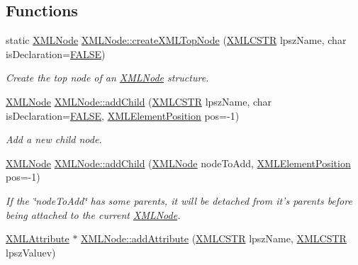 \subsection*{Functions}
\begin{DoxyCompactItemize}
\item 
static \hyperlink{structXMLNode}{X\-M\-L\-Node} \hyperlink{group__creation_ga1e2d0403450db891eedc76b6bfdba452}{X\-M\-L\-Node\-::create\-X\-M\-L\-Top\-Node} (\hyperlink{xmlParser_8h_acdb0d6fd8dd596384b438d86cfb2b182}{X\-M\-L\-C\-S\-T\-R} lpsz\-Name, char is\-Declaration=\hyperlink{xmlParser_8h_aa93f0eb578d23995850d61f7d61c55c1}{F\-A\-L\-S\-E})
\begin{DoxyCompactList}\small\item\em Create the top node of an \hyperlink{structXMLNode}{X\-M\-L\-Node} structure. \end{DoxyCompactList}\item 
\hyperlink{structXMLNode}{X\-M\-L\-Node} \hyperlink{group__creation_ga51baa56a48f69cdea6f41ed38a2cbadd}{X\-M\-L\-Node\-::add\-Child} (\hyperlink{xmlParser_8h_acdb0d6fd8dd596384b438d86cfb2b182}{X\-M\-L\-C\-S\-T\-R} lpsz\-Name, char is\-Declaration=\hyperlink{xmlParser_8h_aa93f0eb578d23995850d61f7d61c55c1}{F\-A\-L\-S\-E}, \hyperlink{xmlParser_8h_aab10d65aadeca1f026f6416becde7432}{X\-M\-L\-Element\-Position} pos=-\/1)
\begin{DoxyCompactList}\small\item\em Add a new child node. \end{DoxyCompactList}\item 
\hyperlink{structXMLNode}{X\-M\-L\-Node} \hyperlink{group__creation_ga37c862f1d4a86f95417f97ceaa40d0fa}{X\-M\-L\-Node\-::add\-Child} (\hyperlink{structXMLNode}{X\-M\-L\-Node} node\-To\-Add, \hyperlink{xmlParser_8h_aab10d65aadeca1f026f6416becde7432}{X\-M\-L\-Element\-Position} pos=-\/1)
\begin{DoxyCompactList}\small\item\em If the \char`\"{}node\-To\-Add\char`\"{} has some parents, it will be detached from it's parents before being attached to the current \hyperlink{structXMLNode}{X\-M\-L\-Node}. \end{DoxyCompactList}\item 
\hyperlink{structXMLAttribute}{X\-M\-L\-Attribute} $\ast$ \hyperlink{group__creation_ga4f0e996a36cdda88b76bdf49d0d2e50c}{X\-M\-L\-Node\-::add\-Attribute} (\hyperlink{xmlParser_8h_acdb0d6fd8dd596384b438d86cfb2b182}{X\-M\-L\-C\-S\-T\-R} lpsz\-Name, \hyperlink{xmlParser_8h_acdb0d6fd8dd596384b438d86cfb2b182}{X\-M\-L\-C\-S\-T\-R} lpsz\-Valuev)

\end{DoxyCompactItemize}
